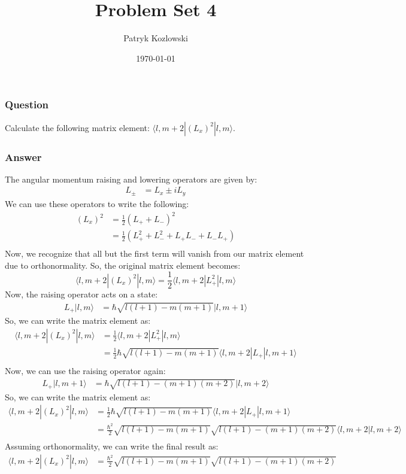 \documentclass[12pt]{article}
\author{Patryk Kozlowski}
\title{Problem Set 4}
\date{\today}
\begin{document}
\maketitle
\section{}
\subsection{}
\subsubsection{Question}
Calculate the following matrix element: $\langle l, m+2| (L_x)^2|l,m \rangle$.
\subsubsection{Answer}
The angular momentum raising and lowering operators are given by:
\begin{align*}
L_{\pm} &= L_x \pm iL_y
\end{align*}
We can use these operators to write the following:
\begin{align*}
(L_x)^2 &= \frac{1}{2}(L_+ + L_-)^2\\
&= \frac{1}{2}(L_+^2 + L_-^2 + L_+L_- + L_-L_+)\\
\end{align*}
Now, we recognize that all but the first term will vanish from our matrix element due to orthonormality. So, the original matrix element becomes:
\begin{equation}
\langle l, m+2| (L_x)^2|l,m \rangle = \frac{1}{2}\langle l, m+2| L_+^2|l,m \rangle
\end{equation}
Now, the raising operator acts on a state:
\begin{align*}
L_+|l,m \rangle &= \hbar \sqrt{l(l+1)-m(m+1)}|l,m+1 \rangle
\end{align*}
So, we can write the matrix element as:
\begin{align*}
\langle l, m+2| (L_x)^2|l,m \rangle &= \frac{1}{2}\langle l, m+2| L_+^2|l,m \rangle\\
&= \frac{1}{2}\hbar \sqrt{l(l+1)-m(m+1)}\langle l, m+2| L_+ |l,m+1 \rangle\\
\end{align*}
Now, we can use the raising operator again:
\begin{align*}
L_+|l,m+1 \rangle &= \hbar \sqrt{l(l+1)-(m+1)(m+2)}|l,m+2 \rangle
\end{align*}
So, we can write the matrix element as:
\begin{align*}
\langle l, m+2| (L_x)^2|l,m \rangle &= \frac{1}{2}\hbar \sqrt{l(l+1)-m(m+1)}\langle l, m+2| L_+ |l,m+1 \rangle\\
&= \frac{\hbar ^2}{2}\sqrt{l(l+1)-m(m+1)} \sqrt{l(l+1)-(m+1)(m+2)}\langle l, m+2|l,m+2 \rangle\\
\end{align*}
Assuming orthonormality, we can write the final result as:
\begin{align*}
\langle l, m+2| (L_x)^2|l,m \rangle &= \frac{\hbar ^2}{2}\sqrt{l(l+1)-m(m+1)} \sqrt{l(l+1)-(m+1)(m+2)}\\
\end{align*}
\end{document}
